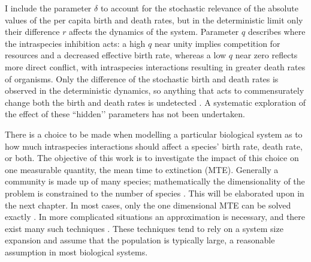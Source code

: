 I include the parameter $\delta$ to account for the stochastic relevance of the absolute values of the per capita birth and death rates, but in the deterministic limit only their difference $r$ affects the dynamics of the system.
Parameter $q$ describes where the intraspecies inhibition acts: a high $q$ near unity implies competition for resources and a decreased effective birth rate, whereas a low $q$ near zero reflects more direct conflict, with intraspecies interactions resulting in greater death rates of organisms.
Only the difference of the stochastic birth and death rates is observed in the deterministic dynamics, so anything that acts to commensurately change both the birth and death rates is undetected \cite{Norden1982,Nasell2001}. 
A systematic exploration of the effect of these ``hidden’’ parameters has not been undertaken. %

There is a choice to be made when modelling a particular biological system as to how much intraspecies interactions should affect a species’ birth rate, death rate, or both. %
The objective of this work is to investigate the impact of this choice on one measurable quantity, the mean time to extinction (MTE).
Generally a community is made up of many species; mathematically the dimensionality of the problem is constrained to the number of species \cite{Armstrong1980}. 
This will be elaborated upon in the next chapter. 
In most cases, only the one dimensional MTE can be solved exactly \cite{Norden1982}. 
In more complicated situations an approximation is necessary, and there exist many such techniques \cite{Nisbet1982,Gardiner2004}. 
These techniques tend to rely on a system size expansion and assume that the population is typically large, a reasonable assumption in most biological systems. 

